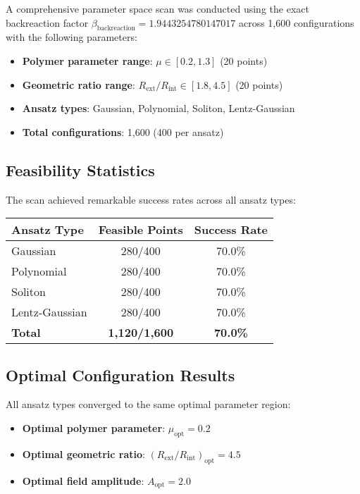 \documentclass[11pt,a4paper]{article}
\begin{document}
A comprehensive parameter space scan was conducted using the exact backreaction factor $\beta_{\text{backreaction}} = 1.9443254780147017$ across 1,600 configurations with the following parameters:

\begin{itemize}
\item \textbf{Polymer parameter range}: $\mu \in [0.2, 1.3]$ (20 points)
\item \textbf{Geometric ratio range}: $R_{\text{ext}}/R_{\text{int}} \in [1.8, 4.5]$ (20 points)  
\item \textbf{Ansatz types}: Gaussian, Polynomial, Soliton, Lentz-Gaussian
\item \textbf{Total configurations}: 1,600 (400 per ansatz)
\end{itemize}

\subsection{Feasibility Statistics}

The scan achieved remarkable success rates across all ansatz types:
\begin{center}
\begin{tabular}{lcc}
\toprule
\textbf{Ansatz Type} & \textbf{Feasible Points} & \textbf{Success Rate} \\
\midrule
Gaussian & 280/400 & 70.0\% \\
Polynomial & 280/400 & 70.0\% \\
Soliton & 280/400 & 70.0\% \\
Lentz-Gaussian & 280/400 & 70.0\% \\
\midrule
\textbf{Total} & \textbf{1,120/1,600} & \textbf{70.0\%} \\
\bottomrule
\end{tabular}
\end{center}

\subsection{Optimal Configuration Results}

All ansatz types converged to the same optimal parameter region:
\begin{itemize}
\item \textbf{Optimal polymer parameter}: $\mu_{\text{opt}} = 0.2$
\item \textbf{Optimal geometric ratio}: $(R_{\text{ext}}/R_{\text{int}})_{\text{opt}} = 4.5$
\item \textbf{Optimal field amplitude}: $A_{\text{opt}} = 2.0$
\end{itemize}
\end{document}
